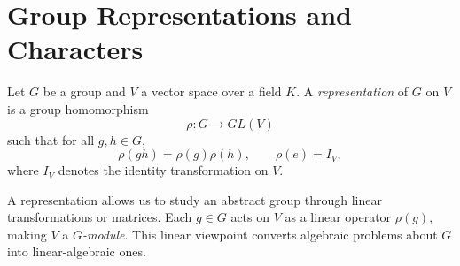 


\section{Group Representations and Characters}

\begin{definition}\label{def:representation}
Let $G$ be a group and $V$ a vector space over a field $K$.  
A \emph{representation} of $G$ on $V$ is a group homomorphism
\[
\rho: G \longrightarrow GL(V)
\]
such that for all $g,h\in G$,
\[
\rho(gh)=\rho(g)\rho(h), \qquad \rho(e)=I_V,
\]
where $I_V$ denotes the identity transformation on $V$.

\end{definition}

\begin{remark}
A representation allows us to study an abstract group through linear transformations or matrices.  
Each $g\in G$ acts on $V$ as a linear operator $\rho(g)$, making $V$ a \emph{$G$-module}.  
This linear viewpoint converts algebraic problems about $G$ into linear-algebraic ones.
\end{remark}

